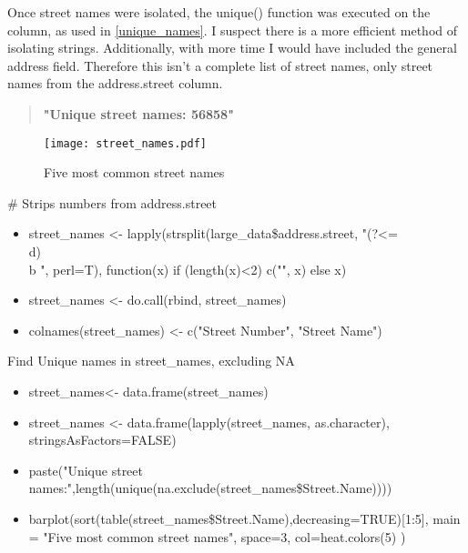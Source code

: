 \documentclass[12pt,fleqn]{report} %
\begin{document}
Once street names were isolated, the unique() function was executed on the column, as used in \ref{unique_names}. I suspect there is a more efficient method of isolating strings. Additionally, with more time I would have included the general address field. Therefore this isn't a complete list of street names, only street names from the address.street column. 

\begin{quote}
	\textbf{"Unique street names: 56858"}
\end{quote}

\begin{figure}[h]
    \centering
    \texttt{[image: street\_names.pdf]}
    \caption{Five most common street names}
    \label{fig:street_names}
\end{figure}

\begin{remark}
# Strips numbers from address.street 
 \begin{itemize}
    	\item street\_names <- lapply(strsplit(large\_data\$address.street, "(?<=\\d)\\b ", perl=T), function(x) if (length(x)<2) c("", x) else x)
    	\item street\_names <- do.call(rbind, street\_names)
    	\item colnames(street\_names) <- c("Street Number", "Street Name")
    \end{itemize}
\end{remark}

\begin{remark}
Find Unique names in street\_names, excluding NA
 \begin{itemize}
    	\item street\_names<- data.frame(street\_names)
    	\item street\_names <- data.frame(lapply(street\_names, as.character), stringsAsFactors=FALSE)
    	\item paste("Unique street names:",length(unique(na.exclude(street\_names\$Street.Name))))
    	\item barplot(sort(table(street\_names\$Street.Name),decreasing=TRUE)[1:5], main = "Five most common street names", space=3, col=heat.colors(5) )
    \end{itemize}
\end{remark}

\end{document}
